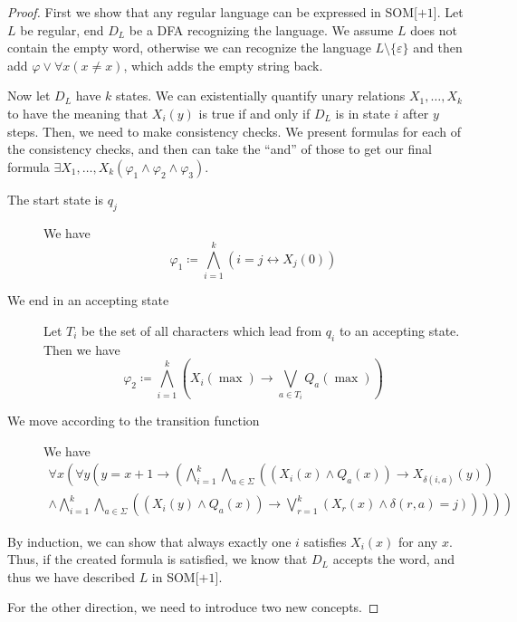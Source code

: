 \begin{proof}
    First we show that any regular language can be expressed in SOM[$+1$].
    Let $L$ be regular, end $D_L$ be a DFA recognizing the language.
    We assume $L$ does not contain the empty word, otherwise we can recognize the language $L \setminus \{\varepsilon\}$ and then add $\varphi \lor \forall x(x \neq x)$, which adds the empty string back.

    Now let $D_L$ have $k$ states.
    We can existentially quantify unary relations $X_1, \dots, X_k$ to have the meaning that $X_i(y)$ is true if and only if $D_L$ is in state $i$ after $y$ steps.
    Then, we need to make consistency checks.
    We present formulas for each of the consistency checks, and then can take the ``and'' of those to get our final formula $\exists X_1, \dots, X_k(\varphi_1 \land \varphi_2 \land \varphi_3)$.
    \begin{description}
        \item[The start state is $q_j$] We have \[\varphi_1 \coloneqq \bigwedge_{i = 1}^{k} (i = j \leftrightarrow X_j(0))\]
        \item[We end in an accepting state] Let $T_i$ be the set of all characters which lead from $q_i$ to an accepting state.
        Then we have
        \[
            \varphi_2 \coloneqq \bigwedge_{i = 1}^{k}\left(X_i(\max) \to \bigvee_{a \in T_i} Q_a(\max)\right)
        \]
        \item[We move according to the transition function] We have
        \begin{align*}
            \forall x\left( \forall y \left( y = x + 1 \to \left(\bigwedge_{i = 1}^{k} \bigwedge_{a \in \Sigma} \left(\left(X_i(x) \land Q_a(x)\right) \to X_{\delta(i, a)}(y)\right) \right. \right. \right. \\
            \left. \left. \left.\land \bigwedge_{i = 1}^{k}\bigwedge_{a \in \Sigma} \left(\left(X_i(y) \land Q_a(x)\right) \to \bigvee_{r = 1}^{k}\left(X_r(x) \land \delta(r, a) = j\right)\right)  \right)  \right) \right)
        \end{align*}
    \end{description}
    By induction, we can show that always exactly one $i$ satisfies $X_i(x)$ for any $x$.
    Thus, if the created formula is satisfied, we know that $D_L$ accepts the word, and thus we have described $L$ in SOM[$+1$].

    \vspace{5mm}

    For the other direction, we need to introduce two new concepts.


\end{proof}

